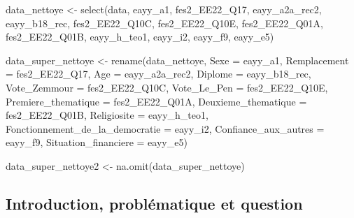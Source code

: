 \documentclass[
  letterpaper,
  DIV=11,
  numbers=noendperiod]{scrartcl}
\newenvironment{Shaded}{\begin{snugshade}}{\end{snugshade}}
\newcommand{\AttributeTok}[1]{\textcolor[rgb]{0.40,0.45,0.13}{#1}}
\newcommand{\FunctionTok}[1]{\textcolor[rgb]{0.28,0.35,0.67}{#1}}
\newcommand{\NormalTok}[1]{\textcolor[rgb]{0.00,0.23,0.31}{#1}}
\newcommand{\OtherTok}[1]{\textcolor[rgb]{0.00,0.23,0.31}{#1}}
\begin{document}
\begin{Shaded}
\begin{Highlighting}[]
\NormalTok{data\_nettoye }\OtherTok{\textless{}{-}} \FunctionTok{select}\NormalTok{(data, eayy\_a1, fes2\_EE22\_Q17, eayy\_a2a\_rec2, eayy\_b18\_rec, fes2\_EE22\_Q10C, fes2\_EE22\_Q10E, fes2\_EE22\_Q01A, fes2\_EE22\_Q01B, eayy\_h\_teo1, eayy\_i2, eayy\_f9, eayy\_e5)}


\NormalTok{data\_super\_nettoye }\OtherTok{\textless{}{-}} \FunctionTok{rename}\NormalTok{(data\_nettoye, }
                             \AttributeTok{Sexe =}\NormalTok{ eayy\_a1,}
                             \AttributeTok{Remplacement =}\NormalTok{ fes2\_EE22\_Q17,}
                             \AttributeTok{Age =}\NormalTok{ eayy\_a2a\_rec2,}
                             \AttributeTok{Diplome =}\NormalTok{ eayy\_b18\_rec,}
                             \AttributeTok{Vote\_Zemmour =}\NormalTok{ fes2\_EE22\_Q10C,}
                             \AttributeTok{Vote\_Le\_Pen =}\NormalTok{ fes2\_EE22\_Q10E,}
                             \AttributeTok{Premiere\_thematique =}\NormalTok{ fes2\_EE22\_Q01A,}
                             \AttributeTok{Deuxieme\_thematique =}\NormalTok{ fes2\_EE22\_Q01B,}
                             \AttributeTok{Religiosite =}\NormalTok{ eayy\_h\_teo1,}
                             \AttributeTok{Fonctionnement\_de\_la\_democratie =}\NormalTok{ eayy\_i2,}
                             \AttributeTok{Confiance\_aux\_autres =}\NormalTok{ eayy\_f9,}
                             \AttributeTok{Situation\_financiere =}\NormalTok{ eayy\_e5)}


\NormalTok{data\_super\_nettoye2 }\OtherTok{\textless{}{-}} \FunctionTok{na.omit}\NormalTok{(data\_super\_nettoye)}
\end{Highlighting}
\end{Shaded}

\hypertarget{introduction-probluxe9matique-et-question}{%
\subsection{Introduction, problématique et
question}\label{introduction-probluxe9matique-et-question}}
\end{document}
